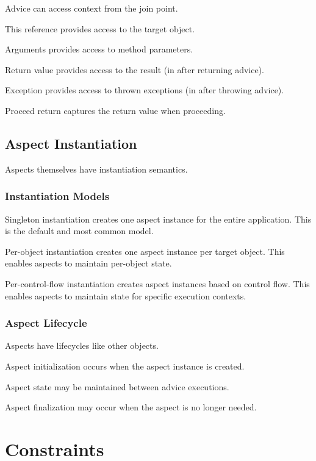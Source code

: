 \documentclass[11pt]{article}
\begin{document}
Advice can access context from the join point.

This reference provides access to the target object.

Arguments provides access to method parameters.

Return value provides access to the result (in after returning advice).

Exception provides access to thrown exceptions (in after throwing advice).

Proceed return captures the return value when proceeding.

\subsection{Aspect Instantiation}

Aspects themselves have instantiation semantics.

\subsubsection{Instantiation Models}

Singleton instantiation creates one aspect instance for the entire application. This is the default and most common model.

Per-object instantiation creates one aspect instance per target object. This enables aspects to maintain per-object state.

Per-control-flow instantiation creates aspect instances based on control flow. This enables aspects to maintain state for specific execution contexts.

\subsubsection{Aspect Lifecycle}

Aspects have lifecycles like other objects.

Aspect initialization occurs when the aspect instance is created.

Aspect state may be maintained between advice executions.

Aspect finalization may occur when the aspect is no longer needed.

\section{Constraints}
\end{document}

